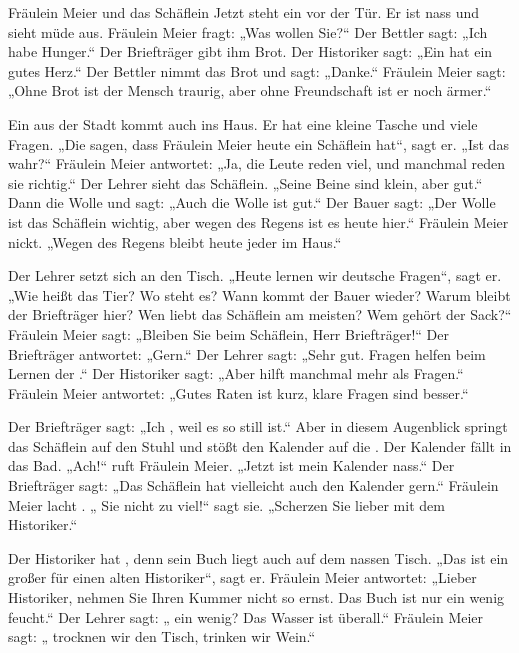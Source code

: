 \documentclass[12pt]{nextbook}
\begin{document}
\begin{readersection}{Fräulein Meier und das Schäflein}
Jetzt steht ein  vor der Tür. Er ist nass und sieht müde aus. Fräulein Meier fragt: „Was wollen Sie?“ Der Bettler sagt: „Ich habe Hunger.“ Der Briefträger gibt ihm Brot. Der Historiker sagt: „Ein  hat ein gutes Herz.“ Der Bettler nimmt das Brot und sagt: „Danke.“ Fräulein Meier sagt: „Ohne Brot ist der Mensch traurig, aber ohne Freundschaft ist er noch ärmer.“

Ein  aus der Stadt kommt auch ins Haus. Er hat eine kleine Tasche und viele Fragen. „Die  sagen, dass Fräulein Meier heute ein Schäflein hat“, sagt er. „Ist das wahr?“ Fräulein Meier antwortet: „Ja, die Leute reden viel, und manchmal reden sie richtig.“ Der Lehrer sieht das Schäflein. „Seine Beine sind klein, aber gut.“ Dann  die Wolle und sagt: „Auch die Wolle ist gut.“ Der Bauer sagt: „Der Wolle  ist das Schäflein wichtig, aber wegen des Regens ist es heute hier.“ Fräulein Meier nickt. „Wegen des Regens bleibt heute jeder im Haus.“

Der Lehrer setzt sich an den Tisch. „Heute lernen wir deutsche Fragen“, sagt er. „Wie heißt das Tier? Wo steht es? Wann kommt der Bauer wieder? Warum bleibt der Briefträger hier? Wen liebt das Schäflein am meisten? Wem gehört der Sack?“ Fräulein Meier sagt: „Bleiben Sie beim Schäflein, Herr Briefträger!“ Der Briefträger antwortet: „Gern.“ Der Lehrer sagt: „Sehr gut. Fragen helfen beim Lernen der .“ Der Historiker sagt: „Aber  hilft manchmal mehr als Fragen.“ Fräulein Meier antwortet: „Gutes Raten ist kurz, klare Fragen sind besser.“

Der Briefträger sagt: „Ich , weil es so still ist.“ Aber in diesem Augenblick springt das Schäflein auf den Stuhl und stößt den Kalender auf die . Der Kalender fällt in das Bad. „Ach!“ ruft Fräulein Meier. „Jetzt ist mein Kalender nass.“ Der Briefträger sagt: „Das Schäflein hat vielleicht auch den Kalender gern.“ Fräulein Meier lacht . „ Sie nicht zu viel!“ sagt sie. „Scherzen Sie lieber mit dem Historiker.“

Der Historiker hat , denn sein Buch liegt auch auf dem nassen Tisch. „Das ist ein großer  für einen alten Historiker“, sagt er. Fräulein Meier antwortet: „Lieber Historiker, nehmen Sie Ihren Kummer nicht so ernst. Das Buch ist nur ein wenig feucht.“ Der Lehrer sagt: „ ein wenig? Das Wasser ist überall.“ Fräulein Meier sagt: „ trocknen wir den Tisch,  trinken wir Wein.“


\end{readersection}
\end{document}
